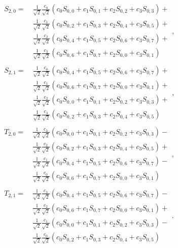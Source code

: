 \begin{gather}
\begin{split}
S_{2,0}  = ~
	& \frac{1}{\sqrt{2}} \frac{c_0}{\sqrt{2}} \left( c_0 S_{0,0} + c_1 S_{0,1} + c_2 S_{0,2} + c_3 S_{0,3} \right) + \\
	& \frac{1}{\sqrt{2}} \frac{c_1}{\sqrt{2}} \left( c_0 S_{0,2} + c_1 S_{0,3} + c_2 S_{0,4} + c_3 S_{0,5} \right) + \\
	& \frac{1}{\sqrt{2}} \frac{c_2}{\sqrt{2}} \left( c_0 S_{0,4} + c_1 S_{0,5} + c_2 S_{0,6} + c_3 S_{0,7} \right) + \\
	& \frac{1}{\sqrt{2}} \frac{c_3}{\sqrt{2}} \left( c_0 S_{0,6} + c_1 S_{0,7} + c_2 S_{0,0} + c_3 S_{0,1} \right)
\end{split}
\label{eqn_db2_outvect_s_2_0_rek}, \\
\begin{split}
S_{2,1}  = ~
	& \frac{1}{\sqrt{2}} \frac{c_0}{\sqrt{2}} \left( c_0 S_{0,4} + c_1 S_{0,5} + c_2 S_{0,6} + c_3 S_{0,7} \right) + \\
	& \frac{1}{\sqrt{2}} \frac{c_1}{\sqrt{2}} \left( c_0 S_{0,6} + c_1 S_{0,7} + c_2 S_{0,0} + c_3 S_{0,1} \right) + \\
	& \frac{1}{\sqrt{2}} \frac{c_2}{\sqrt{2}} \left( c_0 S_{0,0} + c_1 S_{0,1} + c_2 S_{0,2} + c_3 S_{0,3} \right) + \\
	& \frac{1}{\sqrt{2}} \frac{c_3}{\sqrt{2}} \left( c_0 S_{0,2} + c_1 S_{0,3} + c_2 S_{0,4} + c_3 S_{0,5} \right)
\end{split}
\label{eqn_db2_outvect_s_2_1_rek}, \\
\begin{split}
T_{2,0}  = ~
	& \frac{1}{\sqrt{2}} \frac{c_3}{\sqrt{2}} \left( c_0 S_{0,0} + c_1 S_{0,1} + c_2 S_{0,2} + c_3 S_{0,3} \right) - \\
	& \frac{1}{\sqrt{2}} \frac{c_2}{\sqrt{2}} \left( c_0 S_{0,2} + c_1 S_{0,3} + c_2 S_{0,4} + c_3 S_{0,5} \right) + \\
	& \frac{1}{\sqrt{2}} \frac{c_1}{\sqrt{2}} \left( c_0 S_{0,4} + c_1 S_{0,5} + c_2 S_{0,6} + c_3 S_{0,7} \right) - \\
	& \frac{1}{\sqrt{2}} \frac{c_0}{\sqrt{2}} \left( c_0 S_{0,6} + c_1 S_{0,7} + c_2 S_{0,0} + c_3 S_{0,1} \right)
\end{split}
\label{eqn_db2_outvect_t_2_0_rek}, \\
\begin{split}
T_{2,1}  = ~
	& \frac{1}{\sqrt{2}} \frac{c_3}{\sqrt{2}} \left( c_0 S_{0,4} + c_1 S_{0,5} + c_2 S_{0,6} + c_3 S_{0,7} \right) - \\
	& \frac{1}{\sqrt{2}} \frac{c_2}{\sqrt{2}} \left( c_0 S_{0,6} + c_1 S_{0,7} + c_2 S_{0,0} + c_3 S_{0,1} \right) + \\
	& \frac{1}{\sqrt{2}} \frac{c_1}{\sqrt{2}} \left( c_0 S_{0,0} + c_1 S_{0,1} + c_2 S_{0,2} + c_3 S_{0,3} \right) - \\
	& \frac{1}{\sqrt{2}} \frac{c_0}{\sqrt{2}} \left( c_0 S_{0,2} + c_1 S_{0,3} + c_2 S_{0,4} + c_3 S_{0,5} \right)
\end{split}
\label{eqn_db2_outvect_t_2_1_rek}.
\end{gather}
